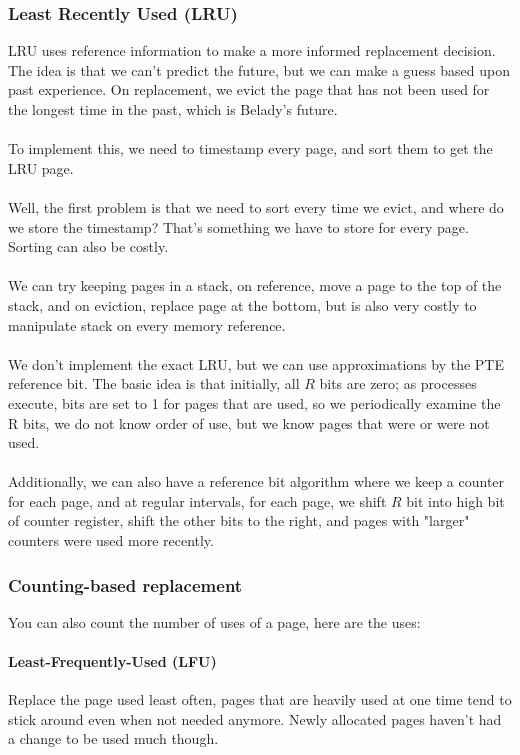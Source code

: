 \documentclass{article}
\begin{document}
\subsubsection{Least Recently Used (LRU)}

LRU uses reference information to make a more informed replacement decision. The idea is that we can't predict the future, but we can make a guess based upon past experience. On replacement, we evict the page that has not been used for the longest time in the past, which is Belady's future.\\
\\
To implement this, we need to timestamp every page, and sort them to get the LRU page.
\\
\\
Well, the first problem is that we need to sort every time we evict, and where do we store the timestamp? That's something we have to store for every page. Sorting can also be costly.
\\
\\
We can try keeping pages in a stack, on reference, move a page to the top of the stack, and on eviction, replace page at the bottom, but is also very costly to manipulate stack on every memory reference.\\
\\
We don't implement the exact LRU, but we can use approximations by the PTE reference bit. The basic idea is that initially, all $R$ bits are zero; as processes execute, bits are set to 1 for pages that are used, so we periodically examine the R bits, we do not know order of use, but we know pages that were or were not used.\\
\\
Additionally, we can also have a reference bit algorithm where we keep a counter for each page, and at regular intervals, for each page, we shift $R$ bit into high bit of counter register, shift the other bits to the right, and pages with "larger" counters were used more recently.

\subsubsection{Counting-based replacement}

You can also count the number of uses of a page, here are the uses:
\paragraph{Least-Frequently-Used (LFU)} Replace the page used least often, pages that are heavily used at one time tend to stick around even when not needed anymore. Newly allocated pages haven't had a change to be used much though.
\end{document}
